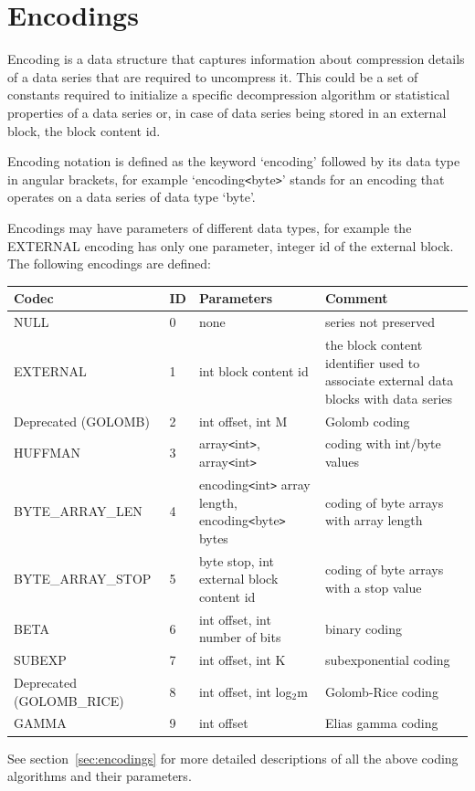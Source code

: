\documentclass[a4paper]{article}
\begin{document}
\section{\textbf{Encodings }}

Encoding is a data structure that captures information about compression details 
of a data series that are required to uncompress it. This could be a set of constants 
required to initialize a specific decompression algorithm or statistical properties 
of a data series or, in case of data series being stored in an external block, 
the block content id. 

Encoding notation is defined as the keyword `encoding' followed by its data type 
in angular brackets, for example `encoding\texttt{<}byte\texttt{>}' stands for 
an encoding that operates on a data series of data type `byte'. 

Encodings may have parameters of different data types, for example the EXTERNAL 
encoding has only one parameter, integer id of the external block. The following 
encodings are defined: 

\begin{tabular}{|l|l|>{\raggedright}p{155pt}|>{\raggedright}p{160pt}|}
\hline
\textbf{Codec} & \textbf{ID} & \textbf{Parameters} & \textbf{Comment}\tabularnewline
\hline
NULL & 0 & none & series not preserved\tabularnewline
\hline
EXTERNAL & 1 & int block content id & the block content identifier used to associate 
external data blocks with data series\tabularnewline
\hline
Deprecated (GOLOMB) & 2 & int offset, int M & Golomb coding\tabularnewline
\hline
HUFFMAN & 3 & array\texttt{<}int\texttt{>}, array\texttt{<}int\texttt{>} & coding with int/byte values\tabularnewline
\hline
BYTE\_ARRAY\_LEN & 4 & encoding\texttt{<}int\texttt{>} array length, encoding\texttt{<}byte\texttt{>} 
bytes & coding of byte arrays with array length\tabularnewline
\hline
BYTE\_ARRAY\_STOP & 5 & byte stop, int external block\linebreak{}
content id & coding of byte arrays with a stop value \tabularnewline
\hline
BETA & 6 & int offset, int number of bits & binary coding\tabularnewline
\hline
SUBEXP & 7 & int offset, int K & subexponential coding\tabularnewline
\hline
Deprecated (GOLOMB\_RICE) & 8 & int offset, int log$_{\text{2}}$m & Golomb-Rice coding\tabularnewline
\hline
GAMMA & 9 & int offset & Elias gamma coding\tabularnewline
\hline
\end{tabular}

See section~\ref{sec:encodings} for more detailed descriptions of all the above coding algorithms and their parameters.
\end{document}
